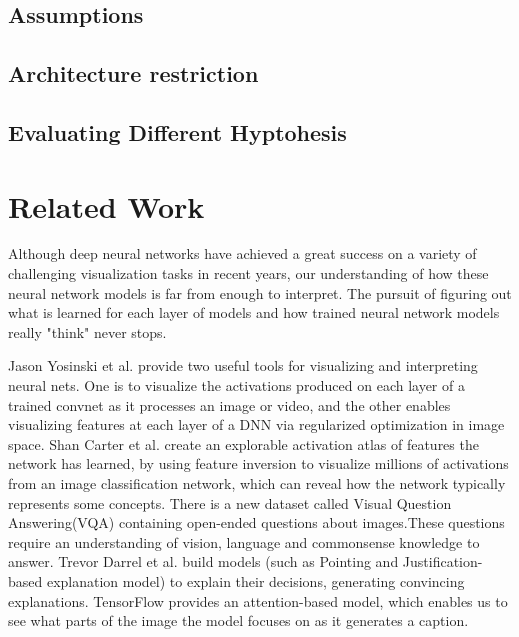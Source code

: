 \documentclass[10pt,twocolumn,letterpaper]{article}
\begin{document}
\subsection{Assumptions}


\subsection{Architecture restriction}




\subsection{Evaluating Different Hyptohesis}





\section{Related Work}
Although deep neural networks have achieved a great success on a variety of challenging visualization tasks in recent years, our understanding of how these neural network models is far from enough to interpret.
The pursuit of figuring out what is learned for each layer of models and how trained neural network models really "think" never stops.

Jason Yosinski et al. provide two useful tools for visualizing and interpreting neural nets. One is to visualize  the activations produced on each layer of a trained convnet as it processes an image or video, and the other enables visualizing features at each layer of a DNN via regularized optimization in image space.
Shan Carter et al. create an explorable activation atlas of features the network has learned, by using feature inversion to visualize millions of activations from an image classification network, which can reveal how the network typically represents some concepts.
There is a new dataset called Visual Question Answering(VQA) containing open-ended questions about images.These questions require an understanding of vision, language and commonsense knowledge to answer.
Trevor Darrel et al. build  models (such as Pointing and Justification-based explanation model) to explain their decisions, generating convincing explanations.
TensorFlow provides an attention-based model, which enables us to see what parts of the image the model focuses on as it generates a caption.
\end{document}
